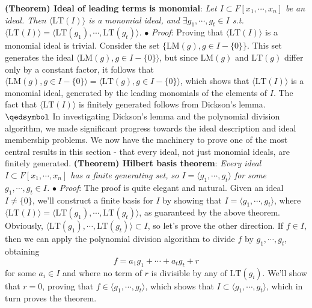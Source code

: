 \documentclass{article}
\begin{document}
\textbf{(Theorem) Ideal of leading terms is monomial}: \textit{Let $ I \subset F[x_1, \cdots, x_n] $ be an ideal. Then $ \langle \text{LT}(I) \rangle $ is a monomial ideal, and $ \exists g_1, \cdots, g_t \in I $ s.t. $ \langle \text{LT}(I) \rangle = \langle \text{LT}(g_1), \cdots, \text{LT}(g_t) \rangle $.}
\newline
\indent $ \bullet $ \textit{Proof}: Proving that $ \langle \text{LT}(I) \rangle $ is a monomial ideal is trivial. Consider the set $ \{ \text{LM}(g), g \in I - \{ 0 \} \} $. This set generates the ideal $ \langle \text{LM}(g), g \in I - \{ 0 \} \rangle $, but since $ \text{LM}(g) $ and $ \text{LT}(g) $ differ only by a constant factor, it follows that $ \langle \text{LM}(g), g \in I - \{ 0 \} \rangle = \langle \text{LT}(g), g \in I - \{ 0 \} \rangle $, which shows that $ \langle \text{LT}(I) \rangle $ is a monomial ideal, generated by the leading monomials of the elements of $ I $. The fact that $ \langle \text{LT}(I) \rangle $ is finitely generated follows from Dickson's lemma. $ \qedsymbol $
\newline \newline
In investigating Dickson's lemma and the polynomial division algorithm, we made significant progress towards the ideal description and ideal membership problems. We now have the machinery to prove one of the most central results in this section - that every ideal, not just monomial ideals, are finitely generated.
\newline \newline
\textbf{(Theorem) Hilbert basis theorem}: \textit{Every ideal $ I \subset F[x_1, \cdots, x_n] $ has a finite generating set, so $ I = \langle g_1, \cdots, g_t \rangle $ for some $ g_1, \cdots, g_t \in I $.}
\newline
\indent $ \bullet $ \textit{Proof}: The proof is quite elegant and natural. Given an ideal $ I \neq \{ 0 \} $, we'll construct a finite basis for $ I $ by showing that $ I = \langle g_1, \cdots, g_t \rangle $, where $ \langle \text{LT}(I) \rangle = \langle \text{LT}(g_1), \cdots, \text{LT}(g_t) \rangle $, as guaranteed by the above theorem.
\newline
\indent Obviously, $ \langle \text{LT}(g_1), \cdots, \text{LT}(g_t) \rangle \subset I $, so let's prove the other direction. If $ f \in I $, then we can apply the polynomial division algorithm to divide $ f $ by $ g_1, \cdots, g_t $, obtaining
$$ f = a_1 g_1 + \cdots + a_t g_t + r $$
for some $ a_i \in I $ and where no term of $ r $ is divisible by any of $ \text{LT}(g_i) $. We'll show that $ r = 0 $, proving that $ f \in \langle g_1, \cdots, g_t \rangle $, which shows that $ I \subset \langle g_1, \cdots, g_t \rangle $, which in turn proves the theorem.
\end{document}

